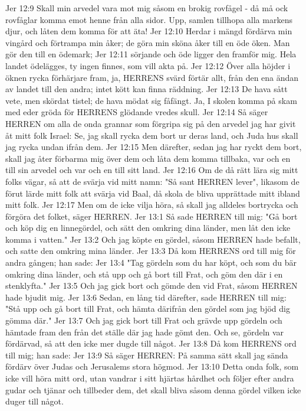 Jer 12:9  Skall min arvedel vara mot mig såsom en brokig rovfågel - då må ock rovfåglar komma emot henne från alla sidor. Upp, samlen tillhopa alla markens djur, och låten dem komma för att äta!
Jer 12:10  Herdar i mängd fördärva min vingård och förtrampa min åker; de göra min sköna åker till en öde öken. Man gör den till en ödemark;
Jer 12:11  sörjande och öde ligger den framför mig. Hela landet ödelägges, ty ingen finnes, som vill akta på.
Jer 12:12  Över alla höjder i öknen rycka förhärjare fram, ja, HERRENS svärd förtär allt, från den ena ändan av landet till den andra; intet kött kan finna räddning.
Jer 12:13  De hava sått vete, men skördat tistel; de hava mödat sig fåfängt. Ja, I skolen komma på skam med eder gröda för HERRENS glödande vredes skull.
Jer 12:14  Så säger HERREN om alla de onda grannar som förgripa sig på den arvedel jag har givit åt mitt folk Israel: Se, jag skall rycka dem bort ur deras land, och Juda hus skall jag rycka undan ifrån dem.
Jer 12:15  Men därefter, sedan jag har ryckt dem bort, skall jag åter förbarma mig över dem och låta dem komma tillbaka, var och en till sin arvedel och var och en till sitt land.
Jer 12:16  Om de då rätt lära sig mitt folks vägar, så att de svärja vid mitt namn: "Så sant HERREN lever", likasom de förut lärde mitt folk att svärja vid Baal, då skola de bliva upprättade mitt ibland mitt folk.
Jer 12:17  Men om de icke vilja höra, så skall jag alldeles bortrycka och förgöra det folket, säger HERREN.
Jer 13:1  Så sade HERREN till mig: "Gå bort och köp dig en linnegördel, och sätt den omkring dina länder, men låt den icke komma i vatten."
Jer 13:2  Och jag köpte en gördel, såsom HERREN hade befallt, och satte den omkring mina länder.
Jer 13:3  Då kom HERRENS ord till mig för andra gången; han sade:
Jer 13:4  "Tag gördeln som du har köpt, och som du bär omkring dina länder, och stå upp och gå bort till Frat, och göm den där i en stenklyfta."
Jer 13:5  Och jag gick bort och gömde den vid Frat, såsom HERREN hade bjudit mig.
Jer 13:6  Sedan, en lång tid därefter, sade HERREN till mig: "Stå upp och gå bort till Frat, och hämta därifrån den gördel som jag bjöd dig gömma där."
Jer 13:7  Och jag gick bort till Frat och grävde upp gördeln och hämtade fram den från det ställe där jag hade gömt den. Och se, gördeln var fördärvad, så att den icke mer dugde till något.
Jer 13:8  Då kom HERRENS ord till mig; han sade:
Jer 13:9  Så säger HERREN: På samma sätt skall jag sända fördärv över Judas och Jerusalems stora högmod.
Jer 13:10  Detta onda folk, som icke vill höra mitt ord, utan vandrar i sitt hjärtas hårdhet och följer efter andra gudar och tjänar och tillbeder dem, det skall bliva såsom denna gördel vilken icke duger till något.
